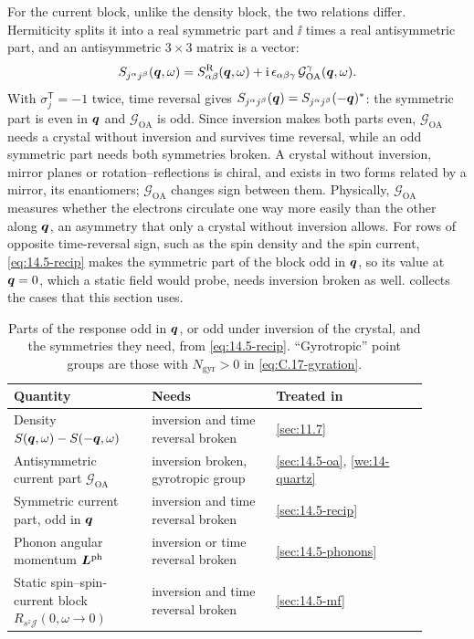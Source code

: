 For the current block, unlike the density block, the two relations differ. Hermiticity splits it into a real symmetric part and $\ii$ times a real antisymmetric part, and an antisymmetric $3\times3$ matrix is a vector:
\begin{equation}
  S_{j^\alpha j^\beta}(\bm{q},\omega) = S^{\mathrm{R}}_{\alpha\beta}(\bm{q},\omega) + \mathrm{i}\,\epsilon_{\alpha\beta\gamma}\,\mathcal{G}^\gamma_{\mathrm{OA}}(\bm{q},\omega) .
  \label{eq:14.5-GOA}
\end{equation}
With $\sigma^{\mathsf{T}}_j = -1$ twice, time reversal gives $S_{j^\alpha j^\beta}(\bm{q}) = S_{j^\alpha j^\beta}(-\bm{q})^*$: the symmetric part is even in $\bm{q}$ and $\boldsymbol{\mathcal{G}}_{\mathrm{OA}}$ is odd. Since inversion makes both parts even, $\boldsymbol{\mathcal{G}}_{\mathrm{OA}}$ needs a crystal without inversion and survives time reversal, while an odd symmetric part needs both symmetries broken. A crystal without inversion, mirror planes or rotation--reflections is chiral, and exists in two forms related by a mirror, its enantiomers; $\boldsymbol{\mathcal{G}}_{\mathrm{OA}}$ changes sign between them. Physically, $\boldsymbol{\mathcal{G}}_{\mathrm{OA}}$ measures whether the electrons circulate one way more easily than the other along $\bm{q}$, an asymmetry that only a crystal without inversion allows. For rows of opposite time-reversal sign, such as the spin density and the spin current, \cref{eq:14.5-recip} makes the symmetric part of the block odd in $\bm{q}$, so its value at $\bm{q} = 0$, which a static field would probe, needs inversion broken as well.  collects the cases that this section uses.

\begin{table}[tbp]
  \caption{Parts of the response odd in $\bm{q}$, or odd under inversion of the crystal, and the symmetries they need, from \cref{eq:14.5-recip}. ``Gyrotropic'' point groups are those with $N_{\mathrm{gyr}} > 0$ in \cref{eq:C.17-gyration}.}
  \label{tab:14-odd}
  \centering\small
  \begin{tabular}{@{}>{\raggedright\arraybackslash}p{0.30\linewidth}>{\raggedright\arraybackslash}p{0.27\linewidth}>{\raggedright\arraybackslash}p{0.33\linewidth}@{}}
    \toprule
    Quantity & Needs & Treated in \\
    \midrule
    Density $S(\bm{q},\omega) - S(-\bm{q},\omega)$ & inversion and time reversal broken & \cref{sec:11.7} \\
    Antisymmetric current part $\boldsymbol{\mathcal{G}}_{\mathrm{OA}}$ & inversion broken, gyrotropic group & \cref{sec:14.5-oa}, \cref{we:14-quartz} \\
    Symmetric current part, odd in $\bm{q}$ & inversion and time reversal broken & \cref{sec:14.5-recip} \\
    Phonon angular momentum $\bm{L}^{\mathrm{ph}}$ & inversion or time reversal broken & \cref{sec:14.5-phonons} \\
    Static spin--spin-current block $R_{s^z\mathcal{J}}(0,\omega \to 0)$ & inversion and time reversal broken & \cref{sec:14.5-mf} \\
    \bottomrule
  \end{tabular}
\end{table}

